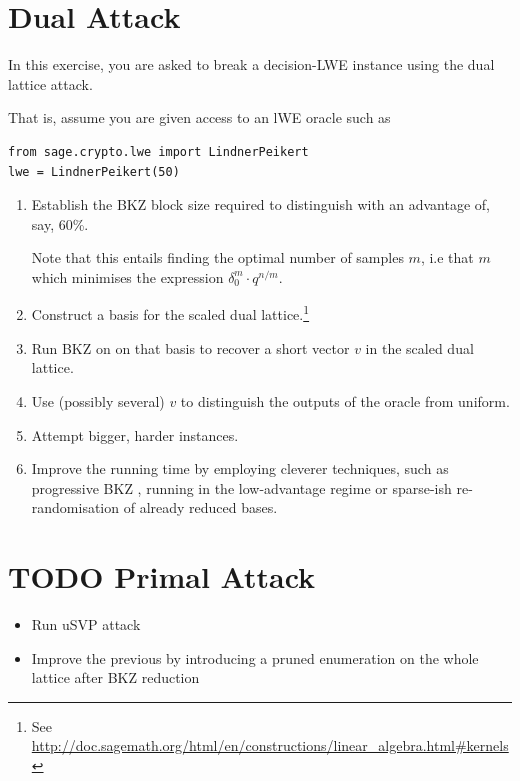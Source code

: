 \documentclass[10pt,a4paper,nobib]{tufte-handout}
\begin{document}
\section{Dual Attack}
\label{sec:orgcafe51a}

In this exercise, you are asked to break a decision-LWE instance using the dual lattice attack.

That is, assume you are given access to an lWE oracle such as

\lstset{language=sage,label= ,caption= ,captionpos=b,numbers=none}
\begin{lstlisting}
from sage.crypto.lwe import LindnerPeikert
lwe = LindnerPeikert(50)
\end{lstlisting}

\begin{enumerate}
\item Establish the BKZ block size required to distinguish with an advantage of, say, 60\%.

Note that this entails finding the optimal number of samples \(m\), i.e that \(m\) which minimises the expression \(δ_0^m ⋅ q^{n/m}\).
\item Construct a basis for the scaled dual lattice.\footnote{See \url{http://doc.sagemath.org/html/en/constructions/linear\_algebra.html\#kernels}}
\item Run BKZ on on that basis to recover a short vector \(v\) in the scaled dual lattice.
\item Use (possibly several) \(v\) to distinguish the outputs of the oracle from uniform.
\item Attempt bigger, harder instances.
\item Improve the running time by employing cleverer techniques, such as progressive BKZ , running in the low-advantage regime or sparse-ish re-randomisation of already reduced bases.
\end{enumerate}

\section{{\bfseries\sffamily TODO} Primal Attack}
\label{sec:org6ab2d14}

\begin{itemize}
\item Run uSVP attack
\item Improve the previous by introducing a pruned enumeration on the whole lattice after BKZ reduction
\end{itemize}
\end{document}
